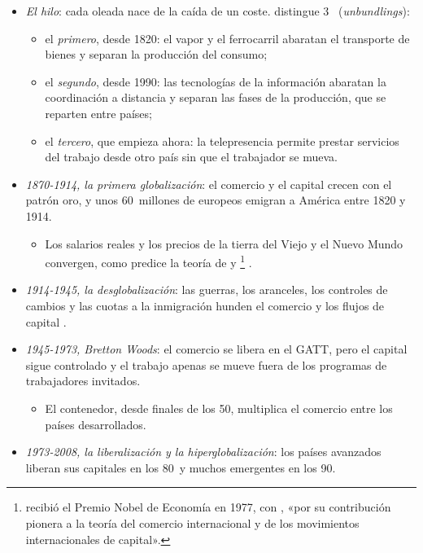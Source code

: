 \documentclass[11pt]{article}
\begin{document}
\begin{itemize}
\item \emph{El hilo}: cada oleada nace de la caída de un coste. \textcite{Baldwin2016Convergence} distingue 3~ (\emph{unbundlings}):
  \begin{itemize}
  \item el \emph{primero}, desde 1820: el vapor y el ferrocarril abaratan el transporte de bienes y separan la producción del consumo;
  \item el \emph{segundo}, desde 1990: las tecnologías de la información abaratan la coordinación a distancia y separan las fases de la producción, que se reparten entre países;
  \item el \emph{tercero}, que empieza ahora: la telepresencia permite prestar servicios del trabajo desde otro país sin que el trabajador se mueva.
  \end{itemize}
\item \emph{1870-1914, la primera globalización}: el comercio y el capital crecen con el patrón oro, y unos 60~millones de europeos emigran a América entre 1820 y 1914\nocite{HattonWilliamson1998Mass}.
  \begin{itemize}
  \item Los salarios reales y los precios de la tierra del Viejo y el Nuevo Mundo convergen, como predice la teoría de  y \footnote{ recibió el Premio Nobel de Economía en 1977, con , «por su contribución pionera a la teoría del comercio internacional y de los movimientos internacionales de capital»\nocite{Nobel1977MeadeOhlin}.}\nocite{ORourkeWilliamson1999Globalization} .
  \end{itemize}
\item \emph{1914-1945, la desglobalización}: las guerras, los aranceles, los controles de cambios y las cuotas a la inmigración hunden el comercio y los flujos de capital .
\item \emph{1945-1973, Bretton Woods}: el comercio se libera en el GATT, pero el capital sigue controlado y el trabajo apenas se mueve fuera de los programas de trabajadores invitados.
  \begin{itemize}
  \item El contenedor, desde finales de los 50, multiplica el comercio entre los países desarrollados\nocite{Bernhofen2016Container}.
  \end{itemize}
\item \emph{1973-2008, la liberalización y la hiperglobalización}: los países avanzados liberan sus capitales en los 80~y muchos emergentes en los 90.

\end{itemize}
\end{document}
